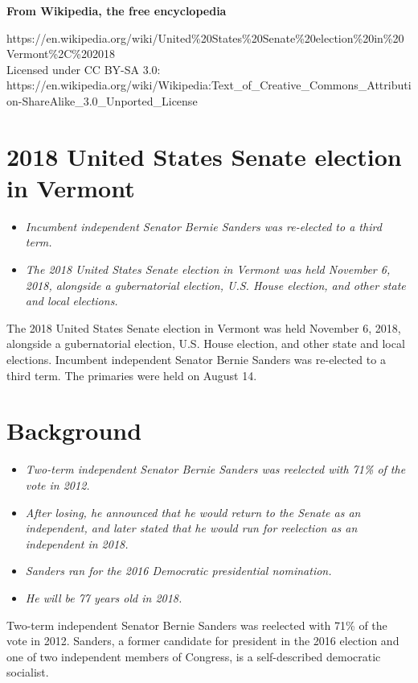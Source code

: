 \textbf{From Wikipedia, the free encyclopedia}

https://en.wikipedia.org/wiki/United\%20States\%20Senate\%20election\%20in\%20Vermont\%2C\%202018\\
Licensed under CC BY-SA 3.0:\\
https://en.wikipedia.org/wiki/Wikipedia:Text\_of\_Creative\_Commons\_Attribution-ShareAlike\_3.0\_Unported\_License

\section{2018 United States Senate election in
Vermont}\label{united-states-senate-election-in-vermont}

\begin{itemize}
\item
  \emph{Incumbent independent Senator Bernie Sanders was re-elected to a
  third term.}
\item
  \emph{The 2018 United States Senate election in Vermont was held
  November 6, 2018, alongside a gubernatorial election, U.S. House
  election, and other state and local elections.}
\end{itemize}

The 2018 United States Senate election in Vermont was held November 6,
2018, alongside a gubernatorial election, U.S. House election, and other
state and local elections. Incumbent independent Senator Bernie Sanders
was re-elected to a third term. The primaries were held on August 14.

\section{Background}\label{background}

\begin{itemize}
\item
  \emph{Two-term independent Senator Bernie Sanders was reelected with
  71\% of the vote in 2012.}
\item
  \emph{After losing, he announced that he would return to the Senate as
  an independent, and later stated that he would run for reelection as
  an independent in 2018.}
\item
  \emph{Sanders ran for the 2016 Democratic presidential nomination.}
\item
  \emph{He will be 77 years old in 2018.}
\end{itemize}

Two-term independent Senator Bernie Sanders was reelected with 71\% of
the vote in 2012. Sanders, a former candidate for president in the 2016
election and one of two independent members of Congress, is a
self-described democratic socialist.


